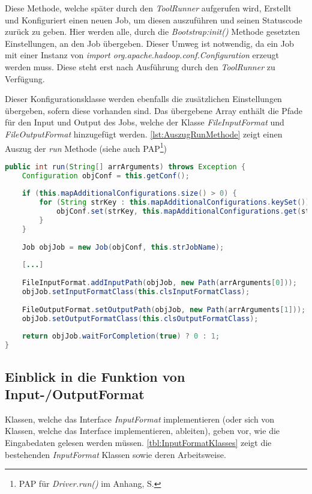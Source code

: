 Diese Methode, welche später durch den \textit{ToolRunner} aufgerufen wird, Erstellt und Konfiguriert einen neuen Job, um diesen auszuführen und seinen Statuscode zurück zu geben. Hier werden alle, durch die \textit{Bootstrap:init()} Methode gesetzten Einstellungen, an den Job übergeben. Dieser Umweg ist notwendig, da ein Job mit einer Instanz von \textit{import org.apache.hadoop.conf.Configuration} erzeugt werden muss. Diese steht erst nach Ausführung durch den \textit{ToolRunner} zu Verfügung.

Dieser Konfigurationsklasse werden ebenfalls die zusätzlichen Einstellungen übergeben, sofern diese vorhanden sind. Das übergebene Array enthält die Pfade für den Input und Output des Jobs, welche der Klasse \textit{FileInputFormat} und \textit{FileOutputFormat} hinzugefügt werden. \autoref{lst:AuszugRunMethode} zeigt einen Auszug der \textit{run} Methode (siehe auch \ac{PAP}\footnote{\ac{PAP} für \textit{Driver.run()} im Anhang, S. \pageref{subsec:PAPDriverRun}}) \\

\begin{lstlisting}[language=Java,caption=Auszug der \textit{run()} Methode,label=lst:AuszugRunMethode]
public int run(String[] arrArguments) throws Exception {
	Configuration objConf = this.getConf();
	
	if (this.mapAdditionalConfigurations.size() > 0) {
		for (String strKey : this.mapAdditionalConfigurations.keySet()) {
			objConf.set(strKey, this.mapAdditionalConfigurations.get(strKey));
		}
	}
	
	Job objJob = new Job(objConf, this.strJobName);
	
	[...]
	
	FileInputFormat.addInputPath(objJob, new Path(arrArguments[0]));
	objJob.setInputFormatClass(this.clsInputFormatClass);
	
	FileOutputFormat.setOutputPath(objJob, new Path(arrArguments[1]));
	objJob.setOutputFormatClass(this.clsOutputFormatClass);
	
	return objJob.waitForCompletion(true) ? 0 : 1;
}
\end{lstlisting}

\subsection{Einblick in die Funktion von Input-/OutputFormat}
Klassen, welche das Interface \textit{InputFormat} implementieren (oder sich von Klassen, welche das Interface implementieren, ableiten), geben vor, wie die Eingabedaten gelesen werden müssen. \autoref{tbl:InputFormatKlasses} zeigt die bestehenden \textit{InputFormat} Klassen sowie deren Arbeitsweise.

